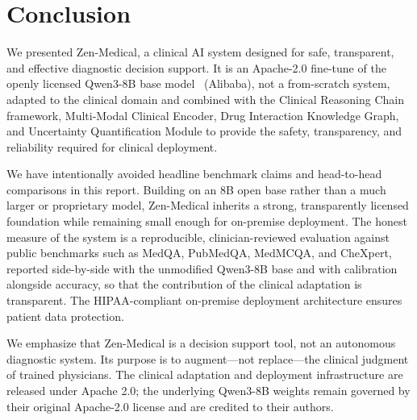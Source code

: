 \documentclass[11pt,a4paper]{article}
\begin{document}
\section{Conclusion}
\label{sec:conclusion}

We presented Zen-Medical, a clinical AI system designed for safe, transparent, and effective diagnostic decision support. It is an Apache-2.0 fine-tune of the openly licensed Qwen3-8B base model~\citep{qwen3} (Alibaba), not a from-scratch system, adapted to the clinical domain and combined with the Clinical Reasoning Chain framework, Multi-Modal Clinical Encoder, Drug Interaction Knowledge Graph, and Uncertainty Quantification Module to provide the safety, transparency, and reliability required for clinical deployment.

We have intentionally avoided headline benchmark claims and head-to-head comparisons in this report. Building on an 8B open base rather than a much larger or proprietary model, Zen-Medical inherits a strong, transparently licensed foundation while remaining small enough for on-premise deployment. The honest measure of the system is a reproducible, clinician-reviewed evaluation against public benchmarks such as MedQA, PubMedQA, MedMCQA, and CheXpert, reported side-by-side with the unmodified Qwen3-8B base and with calibration alongside accuracy, so that the contribution of the clinical adaptation is transparent. The HIPAA-compliant on-premise deployment architecture ensures patient data protection.

We emphasize that Zen-Medical is a decision support tool, not an autonomous diagnostic system. Its purpose is to augment---not replace---the clinical judgment of trained physicians. The clinical adaptation and deployment infrastructure are released under Apache 2.0; the underlying Qwen3-8B weights remain governed by their original Apache-2.0 license and are credited to their authors.
\end{document}

